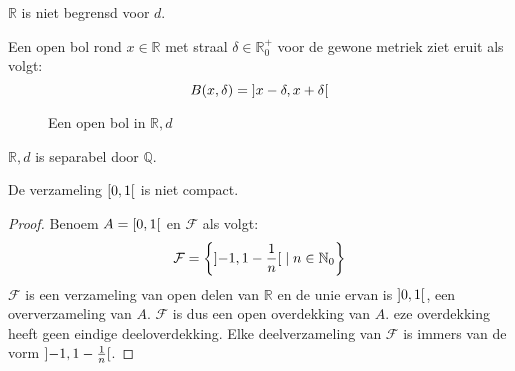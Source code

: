 \documentclass[main.tex]{subfiles}
\begin{document}
\begin{opm}
  $\mathbb{R}$ is niet begrensd voor $d$.
\end{opm}

\begin{vb}
  Een open bol rond $x\in \mathbb{R}$ met straal $\delta\in \mathbb{R}_{0}^{+}$ voor de gewone metriek ziet eruit als volgt:
  \[ B(x,\delta) = \interval[open]{x-\delta}{x+\delta} \]
  \begin{figure}[H]
    \centering
    \caption{Een open bol in $\mathbb{R},d$}
  \end{figure}
\end{vb}

\begin{vb}
  $\mathbb{R},d$ is separabel door $\mathbb{Q}$.
\end{vb}

\begin{vb}
  De verzameling $\interval[open right]{0}{1}$ is niet compact.
  \begin{proof}
    Benoem $A = \interval[open right]{0}{1}$ en $\mathcal{F}$ als volgt:
    \[ \mathcal{F} = \left\{      \interval[open]{-1}{1-\frac{1}{n}} \mid n \in \mathbb{N}_{0} \right\} \]
    $\mathcal{F}$ is een verzameling van open delen van $\mathbb{R}$ en de unie ervan is $\interval[open]{0}{1}$, een oververzameling van $A$.
    $\mathcal{F}$ is dus een open overdekking van $A$.
    eze overdekking heeft geen eindige deeloverdekking.
    Elke deelverzameling van $\mathcal{F}$ is immers van de vorm $\interval[open]{-1}{1-\frac{1}{n}}$.
  \end{proof}
\end{vb}
\end{document}
